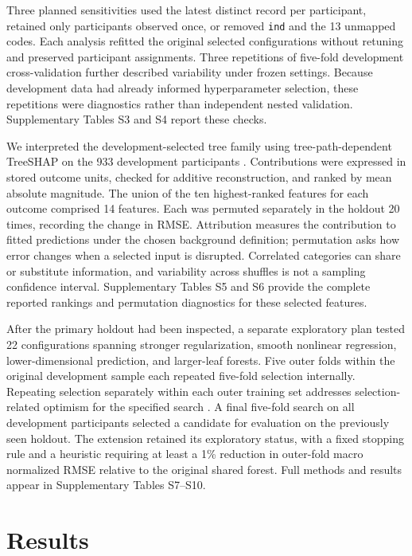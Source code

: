 Three planned sensitivities used the latest distinct record per participant, retained only participants observed once, or removed \texttt{ind} and the 13 unmapped codes. Each analysis refitted the original selected configurations without retuning and preserved participant assignments. Three repetitions of five-fold development cross-validation further described variability under frozen settings. Because development data had already informed hyperparameter selection, these repetitions were diagnostics rather than independent nested validation. Supplementary Tables S3 and S4 report these checks.

We interpreted the development-selected tree family using tree-path-dependent TreeSHAP on the 933 development participants \citep{lundberg2020}. Contributions were expressed in stored outcome units, checked for additive reconstruction, and ranked by mean absolute magnitude. The union of the ten highest-ranked features for each outcome comprised 14 features. Each was permuted separately in the holdout 20 times, recording the change in RMSE. Attribution measures the contribution to fitted predictions under the chosen background definition; permutation asks how error changes when a selected input is disrupted. Correlated categories can share or substitute information, and variability across shuffles is not a sampling confidence interval. Supplementary Tables S5 and S6 provide the complete reported rankings and permutation diagnostics for these selected features.

After the primary holdout had been inspected, a separate exploratory plan tested 22 configurations spanning stronger regularization, smooth nonlinear regression, lower-dimensional prediction, and larger-leaf forests. Five outer folds within the original development sample each repeated five-fold selection internally. Repeating selection separately within each outer training set addresses selection-related optimism for the specified search \citep{cawley2010}. A final five-fold search on all development participants selected a candidate for evaluation on the previously seen holdout. The extension retained its exploratory status, with a fixed stopping rule and a heuristic requiring at least a 1\% reduction in outer-fold macro normalized RMSE relative to the original shared forest. Full methods and results appear in Supplementary Tables S7--S10.

\section{Results}
